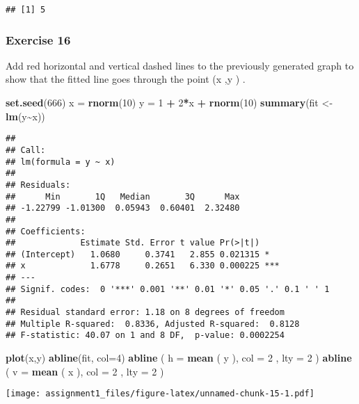 \documentclass[
]{article}
\newenvironment{Shaded}{\begin{snugshade}}{\end{snugshade}}
\newcommand{\DataTypeTok}[1]{\textcolor[rgb]{0.13,0.29,0.53}{#1}}
\newcommand{\DecValTok}[1]{\textcolor[rgb]{0.00,0.00,0.81}{#1}}
\newcommand{\KeywordTok}[1]{\textcolor[rgb]{0.13,0.29,0.53}{\textbf{#1}}}
\newcommand{\NormalTok}[1]{#1}
\newcommand{\OperatorTok}[1]{\textcolor[rgb]{0.81,0.36,0.00}{\textbf{#1}}}
\newcommand{\StringTok}[1]{\textcolor[rgb]{0.31,0.60,0.02}{#1}}
\begin{document}
\begin{verbatim}
## [1] 5
\end{verbatim}

\hypertarget{exercise-16}{%
\subsubsection{Exercise 16}\label{exercise-16}}

Add red horizontal and vertical dashed lines to the previously generated
graph to show that the fitted line goes through the point (x ,y ) .

\begin{Shaded}
\begin{Highlighting}[]
\KeywordTok{set.seed}\NormalTok{(}\DecValTok{666}\NormalTok{)}
\NormalTok{x =}\StringTok{ }\KeywordTok{rnorm}\NormalTok{(}\DecValTok{10}\NormalTok{)}
\NormalTok{y =}\StringTok{ }\DecValTok{1} \OperatorTok{+}\StringTok{ }\DecValTok{2}\OperatorTok{*}\NormalTok{x }\OperatorTok{+}\StringTok{ }\KeywordTok{rnorm}\NormalTok{(}\DecValTok{10}\NormalTok{)}
\KeywordTok{summary}\NormalTok{(fit \textless{}{-}}\StringTok{ }\KeywordTok{lm}\NormalTok{(y}\OperatorTok{\textasciitilde{}}\NormalTok{x))}
\end{Highlighting}
\end{Shaded}

\begin{verbatim}
## 
## Call:
## lm(formula = y ~ x)
## 
## Residuals:
##      Min       1Q   Median       3Q      Max 
## -1.22799 -1.01300  0.05943  0.60401  2.32480 
## 
## Coefficients:
##             Estimate Std. Error t value Pr(>|t|)    
## (Intercept)   1.0680     0.3741   2.855 0.021315 *  
## x             1.6778     0.2651   6.330 0.000225 ***
## ---
## Signif. codes:  0 '***' 0.001 '**' 0.01 '*' 0.05 '.' 0.1 ' ' 1
## 
## Residual standard error: 1.18 on 8 degrees of freedom
## Multiple R-squared:  0.8336, Adjusted R-squared:  0.8128 
## F-statistic: 40.07 on 1 and 8 DF,  p-value: 0.0002254
\end{verbatim}

\begin{Shaded}
\begin{Highlighting}[]
\KeywordTok{plot}\NormalTok{(x,y)}
\KeywordTok{abline}\NormalTok{(fit, }\DataTypeTok{col=}\DecValTok{4}\NormalTok{)}
\KeywordTok{abline}\NormalTok{ ( }\DataTypeTok{h =} \KeywordTok{mean}\NormalTok{ ( y ), }\DataTypeTok{col =} \DecValTok{2}\NormalTok{ , }\DataTypeTok{lty =} \DecValTok{2}\NormalTok{ )}
\KeywordTok{abline}\NormalTok{ ( }\DataTypeTok{v =} \KeywordTok{mean}\NormalTok{ ( x ), }\DataTypeTok{col =} \DecValTok{2}\NormalTok{ , }\DataTypeTok{lty =} \DecValTok{2}\NormalTok{ )}
\end{Highlighting}
\end{Shaded}

\texttt{[image: assignment1\_files/figure-latex/unnamed-chunk-15-1.pdf]}
\end{document}
